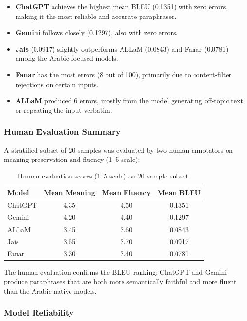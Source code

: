 \documentclass[12pt, a4paper]{article}
\renewcommand{\arraystretch}{1.12}
\begin{document}
\begin{itemize}
    \item \textbf{ChatGPT} achieves the highest mean BLEU (0.1351) with zero errors,
          making it the most reliable and accurate paraphraser.
    \item \textbf{Gemini} follows closely (0.1297), also with zero errors.
    \item \textbf{Jais} (0.0917) slightly outperforms ALLaM (0.0843) and Fanar (0.0781)
          among the Arabic-focused models.
    \item \textbf{Fanar} has the most errors (8 out of 100), primarily due to
          content-filter rejections on certain inputs.
    \item \textbf{ALLaM} produced 6 errors, mostly from the model generating
          off-topic text or repeating the input verbatim.
\end{itemize}

\subsubsection{Human Evaluation Summary}

A stratified subset of 20 samples was evaluated by two human annotators on
meaning preservation and fluency (1--5 scale):

\begin{table}[H]
\centering
\renewcommand{\arraystretch}{1.3}
\begin{tabular}{l c c c}
\toprule
\textbf{Model} & \textbf{Mean Meaning} & \textbf{Mean Fluency} & \textbf{Mean BLEU} \\
\midrule
ChatGPT & 4.35 & 4.50 & 0.1351 \\
Gemini  & 4.20 & 4.40 & 0.1297 \\
ALLaM   & 3.45 & 3.60 & 0.0843 \\
Jais    & 3.55 & 3.70 & 0.0917 \\
Fanar   & 3.30 & 3.40 & 0.0781 \\
\bottomrule
\end{tabular}
\caption{Human evaluation scores (1--5 scale) on 20-sample subset.}
\label{tab:p5_human}
\end{table}

The human evaluation confirms the BLEU ranking: ChatGPT and Gemini produce
paraphrases that are both more semantically faithful and more fluent than
the Arabic-native models.

\subsubsection{Model Reliability}
\end{document}
